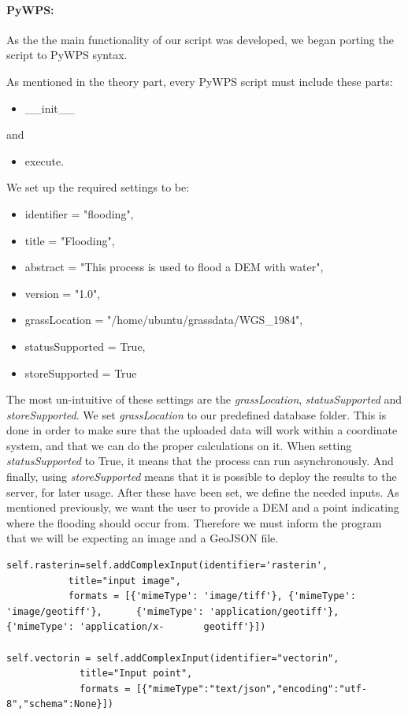 \paragraph{PyWPS:} As the the main functionality of our script was developed, we began porting the script to PyWPS syntax. 

As mentioned in the theory part, every PyWPS script must include these parts:
\begin{itemize}
\item \_\_init\_\_ 
\end{itemize}
and 
\begin{itemize}
\item execute.
\end{itemize}
  
We set up the required settings to be:

\begin{itemize}
\item identifier = "flooding",
\item title = "Flooding",
\item abstract = "This process is used to flood a DEM with water",
\item version = "1.0",
\item grassLocation = "/home/ubuntu/grassdata/WGS\_1984",
\item statusSupported = True,
\item storeSupported = True
\end{itemize}

The most un-intuitive of these settings are the \textit{grassLocation}, \textit{statusSupported} and \textit{storeSupported}. 
We set \textit{grassLocation} to our predefined database folder. This is done in order to make sure that the uploaded data will work within a coordinate system, and that we can do the proper calculations on it.
When setting \textit{statusSupported} to True, it means that the process can run asynchronously. 
And finally, using \textit{storeSupported} means that it is possible to deploy the results to the server, for later usage. 
After these have been set, we define the needed inputs. As mentioned previously, we want the user to provide a DEM and a point indicating where the flooding should occur from. Therefore we must inform the program that we will be expecting an image and a GeoJSON file. 

\begin{lstlisting}
self.rasterin=self.addComplexInput(identifier='rasterin',
		   title="input image",
	   	   formats = [{'mimeType': 'image/tiff'}, {'mimeType': 			             	'image/geotiff'}, 	   {'mimeType': 'application/geotiff'}, 		            {'mimeType': 'application/x-	   geotiff'}])
	   	   
self.vectorin = self.addComplexInput(identifier="vectorin",
		     title="Input point",
		     formats = [{"mimeType":"text/json","encoding":"utf-			              8","schema":None}])

\end{lstlisting}

